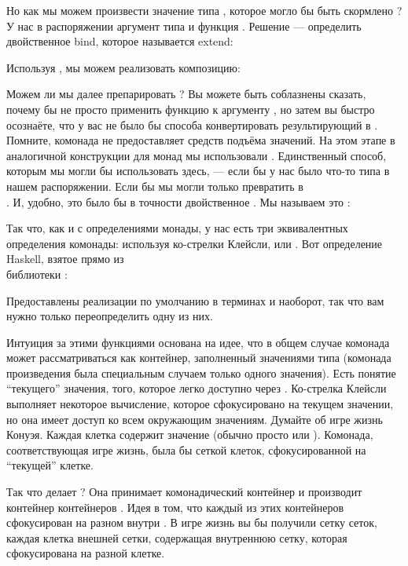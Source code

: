 Но как мы можем произвести значение типа , которое могло бы быть скормлено
? У нас в распоряжении аргумент типа
 и функция .
Решение --- определить двойственное bind, которое называется extend:

Используя , мы можем реализовать композицию:

Можем ли мы далее препарировать ? Вы можете быть соблазнены сказать, почему
бы не просто применить функцию  к
аргументу , но затем вы быстро осознаёте, что у вас не было бы
способа конвертировать результирующий  в . Помните,
комонада не предоставляет средств подъёма значений. На этом этапе в
аналогичной конструкции для монад мы использовали . Единственный способ,
которым мы могли бы использовать  здесь, --- если бы у нас было что-то типа
 в нашем распоряжении. Если бы мы могли только превратить 
в\\ . И, удобно, это было бы в точности
двойственное . Мы называем это :

Так что, как и с определениями монады, у нас есть три
эквивалентных определения комонады: используя ко-стрелки Клейсли,
 или . Вот определение Haskell,
взятое прямо из\\ библиотеки :

Предоставлены реализации по умолчанию  в терминах
 и наоборот, так что вам нужно только переопределить одну из
них.

Интуиция за этими функциями основана на идее, что в
общем случае комонада может рассматриваться как контейнер, заполненный значениями
типа  (комонада произведения была специальным случаем только одного
значения). Есть понятие ``текущего'' значения, того, которое легко
доступно через . Ко-стрелка Клейсли выполняет некоторое
вычисление, которое сфокусировано на текущем значении, но она имеет доступ ко
всем окружающим значениям. Думайте об игре жизнь Конуэя. Каждая
клетка содержит значение (обычно просто  или ).
Комонада, соответствующая игре жизнь, была бы сеткой клеток,
сфокусированной на ``текущей'' клетке.

Так что делает ? Она принимает комонадический контейнер
 и производит контейнер контейнеров .
Идея в том, что каждый из этих контейнеров сфокусирован на разном
 внутри . В игре жизнь вы бы получили
сетку сеток, каждая клетка внешней сетки, содержащая внутреннюю сетку,
которая сфокусирована на разной клетке.


